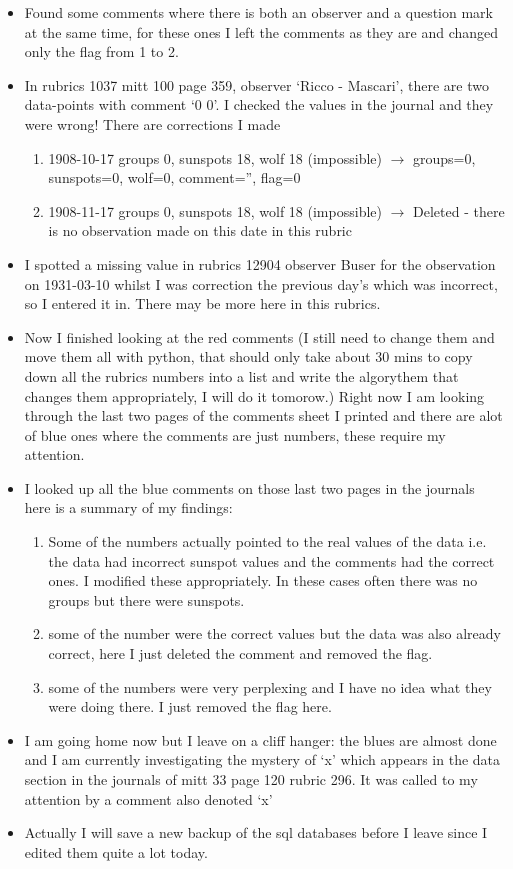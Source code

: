 \documentclass[12pt]{article}
\begin{document}
\begin{itemize}
    \item Found some comments where there is both an observer and a question mark at the same time, for these ones I left the comments as they are and changed only the flag from 1 to 2.
    \item In rubrics 1037 mitt 100 page 359, observer `Ricco - Mascari', there are two data-points with comment `0 0'. I checked the values in the journal and they were wrong! There are corrections I made
    \begin{enumerate}
        \item 1908-10-17 groups 0, sunspots 18, wolf 18 (impossible) $\to$ groups=0, sunspots=0, wolf=0, comment='', flag=0
        \item 1908-11-17 groups 0, sunspots 18, wolf 18 (impossible) $\to$ Deleted - there is no observation made on this date in this rubric
    \end{enumerate}
    \item I spotted a missing value in rubrics 12904 observer Buser for the observation on 1931-03-10 whilst I was correction the previous day's which was incorrect, so I entered it in. There may be more here in this rubrics.
    \item Now I finished looking at the red comments (I still need to change them and move them all with python, that should only take about 30 mins to copy down all the rubrics numbers into a list and write the algorythem that changes them appropriately, I will do it tomorow.) Right now I am looking through the last two pages of the comments sheet I printed and there are alot of blue ones where the comments are just numbers, these require my attention.
    \item I looked up all the blue comments on those last two pages in the journals here is a summary of my findings:
    \begin{enumerate}
        \item Some of the numbers actually pointed to the real values of the data i.e. the data had incorrect sunspot values and the comments had the correct ones. I modified these appropriately. In these cases often there was no groups but there were sunspots.
        \item some of the number were the correct values but the data was also already correct, here I just deleted the comment and removed the flag.
        \item some of the numbers were very perplexing and I have no idea what they were doing there. I just removed the flag here.
    \end{enumerate}
    \item I am going home now but I leave on a cliff hanger: the blues are almost done and I am currently investigating the mystery of `x' which appears in the data section in the journals of mitt 33 page 120 rubric 296. It was called to my attention by a comment also denoted `x'
    \item Actually I will save a new backup of the sql databases before I leave since I edited them quite a lot today.
    \end{itemize}
            
\end{document}
